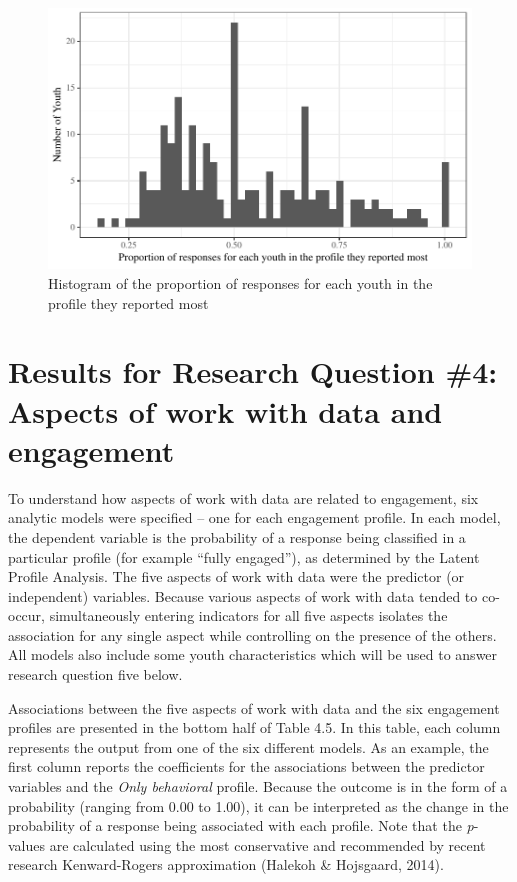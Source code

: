 \documentclass[]{book}
\theoremstyle{definition}
\theoremstyle{definition}
\theoremstyle{definition}
\theoremstyle{remark}
\begin{document}
\begin{figure}

{\centering \includegraphics[width=0.8\linewidth]{rosenberg-dissertation_files/figure-latex/unnamed-chunk-14-1} 

}

\caption{Histogram of the proportion of responses for each youth in the profile they reported most}\label{fig:unnamed-chunk-14}
\end{figure}

\section{Results for Research Question \#4: Aspects of work with data
and
engagement}\label{results-for-research-question-4-aspects-of-work-with-data-and-engagement}

To understand how aspects of work with data are related to engagement,
six analytic models were specified -- one for each engagement profile.
In each model, the dependent variable is the probability of a response
being classified in a particular profile (for example ``fully
engaged''), as determined by the Latent Profile Analysis. The five
aspects of work with data were the predictor (or independent) variables.
Because various aspects of work with data tended to co-occur,
simultaneously entering indicators for all five aspects isolates the
association for any single aspect while controlling on the presence of
the others. All models also include some youth characteristics which
will be used to answer research question five below.

Associations between the five aspects of work with data and the six
engagement profiles are presented in the bottom half of Table 4.5. In
this table, each column represents the output from one of the six
different models. As an example, the first column reports the
coefficients for the associations between the predictor variables and
the \emph{Only behavioral} profile. Because the outcome is in the form
of a probability (ranging from 0.00 to 1.00), it can be interpreted as
the change in the probability of a response being associated with each
profile. Note that the \emph{p}-values are calculated using the most
conservative and recommended by recent research Kenward-Rogers
approximation (Halekoh \& Hojsgaard, 2014).
\end{document}
